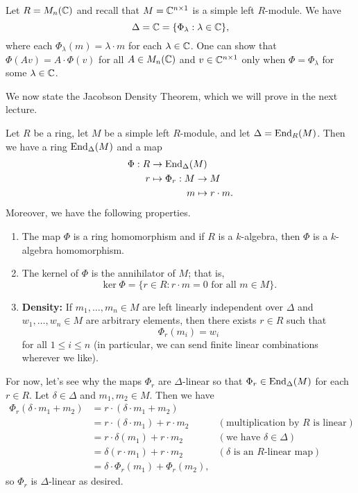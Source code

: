 \begin{exmp}{}
Let $R = M_n(\mathbb{C})$ and recall that $M = \mathbb{C}^{n\times 1}$ is a simple left $R$-module. We have 
\[ \Delta = \mathbb{C} = \{\Phi_\lambda : \lambda \in \mathbb{C}\}, \]
where each $\Phi_\lambda(m) = \lambda \cdot m$ for each $\lambda \in \mathbb{C}$. One can show that 
$\Phi(Av) = A \cdot \Phi(v)$ for all $A \in M_n(\mathbb{C})$ and $v \in \mathbb{C}^{n\times 1}$ only when 
$\Phi = \Phi_\lambda$ for some $\lambda \in \mathbb{C}$. 
\end{exmp}

We now state the Jacobson Density Theorem, which we will prove in the next lecture. 

\begin{theo}{}
Let $R$ be a ring, let $M$ be a simple left $R$-module, and let $\Delta = \operatorname{End}_R(M)$. Then we have a 
ring $\operatorname{End}_\Delta(M)$ and a map 
\begin{align*}
    \Phi : R &\to \operatorname{End}_\Delta(M) \\
    r &\mapsto \Phi_r : M \to M \\
    & \hspace{1.33cm} m \mapsto r \cdot m.
\end{align*}
Moreover, we have the following properties. 
\begin{enumerate}[(1)]
    \item The map $\Phi$ is a ring homomorphism and if $R$ is a $k$-algebra, then $\Phi$ is a 
    $k$-algebra homomorphism.
    \item The kernel of $\Phi$ is the annihilator of $M$; that is, 
    \[ \ker\Phi = \{r \in R : r \cdot m = 0 \text{ for all } m \in M\}. \]
    \item {\bf Density:} If $m_1, \dots, m_n \in M$ are left linearly independent over $\Delta$ and 
    $w_1, \dots, w_n \in M$ are arbitrary elements, then there exists $r \in R$ such that 
    \[ \Phi_r(m_i) = w_i \]
    for all $1 \leq i \leq n$ (in particular, we can send finite linear combinations wherever we like).
\end{enumerate}
\end{theo}

For now, let's see why the maps $\Phi_r$ are $\Delta$-linear so that $\Phi_r \in \operatorname{End}_\Delta(M)$
for each $r \in R$. 
Let $\delta \in \Delta$ and $m_1, m_2 \in M$. Then we have 
\begin{align*}
    \Phi_r(\delta \cdot m_1 + m_2) &= r \cdot (\delta \cdot m_1 + m_2) \\
    &= r \cdot (\delta \cdot m_1) + r \cdot m_2 & (\text{multiplication by $R$ is linear}) \\
    &= r \cdot \delta(m_1) + r \cdot m_2 & (\text{we have $\delta \in \Delta$}) \\
    &= \delta(r \cdot m_1) + r \cdot m_2 & (\text{$\delta$ is an $R$-linear map}) \\
    &= \delta \cdot \Phi_r(m_1 ) + \Phi_r(m_2),
\end{align*}
so $\Phi_r$ is $\Delta$-linear as desired. 